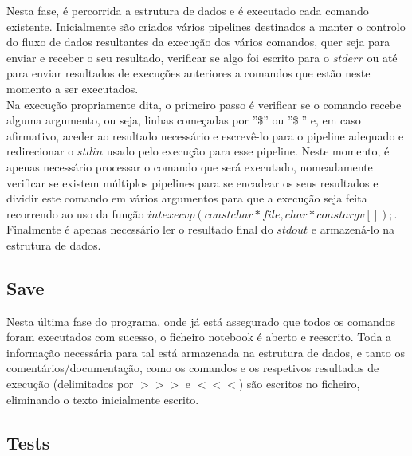 \documentclass[a4paper]{article}
\begin{document}
Nesta fase, é percorrida a estrutura de dados e é executado cada comando
existente. Inicialmente são criados vários pipelines destinados a manter o
controlo do fluxo de dados resultantes da execução dos vários comandos, quer
seja para enviar e receber o seu resultado, verificar se algo foi escrito
para o $stderr$ ou até para enviar resultados de execuções anteriores a comandos
que estão neste momento a ser executados.\\
Na execução propriamente dita, o primeiro passo é verificar se o comando
recebe alguma argumento, ou seja, linhas começadas por ''\$'' ou ''\$|'' e,
em caso afirmativo, aceder ao resultado necessário e escrevê-lo para o pipeline
adequado e redirecionar o $stdin$ usado pelo execução para esse pipeline.
Neste momento, é apenas necessário processar o comando que será executado,
nomeadamente verificar se existem múltiplos pipelines para se encadear os seus
resultados e dividir este comando em vários argumentos para que a execução
seja feita recorrendo ao uso da função
$int execvp(const char *file, char *const argv[]);$.
Finalmente é apenas necessário ler o resultado final do $stdout$ e armazená-lo
na estrutura de dados.


\subsection{Save}
\label{sec:save}

Nesta última fase do programa, onde já está assegurado que todos os comandos
foram executados com sucesso, o ficheiro notebook é aberto e reescrito.
Toda a informação necessária para tal está armazenada na estrutura de dados, e
tanto os comentários/documentação, como os comandos e os respetivos
resultados de execução
(delimitados por $>>>$ e $<<<$) são escritos no ficheiro, eliminando o
texto inicialmente escrito.



\subsection{Tests}
\label{sec:tests}
\end{document}
